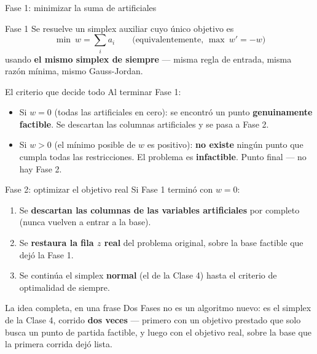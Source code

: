 \documentclass[aspectratio=169]{beamer}
\begin{document}
\begin{frame}{Fase 1: minimizar la suma de artificiales}
\begin{block}{Fase 1}
\small Se resuelve un simplex auxiliar cuyo único objetivo es
\[
\min\ w=\sum_i a_i \qquad\text{(equivalentemente, } \max\ w'=-w\text{)}
\]
usando \textbf{el mismo simplex de siempre} --- misma regla de entrada, misma razón mínima, mismo Gauss-Jordan.
\normalsize
\end{block}

\vspace{-0.1cm}
\begin{alertblock}{El criterio que decide todo}
\small Al terminar Fase 1:
\begin{itemize}
\item Si $w=0$ (todas las artificiales en cero): se encontró un punto \textbf{genuinamente factible}. Se descartan las columnas artificiales y se pasa a Fase 2.
\item Si $w>0$ (el mínimo posible de $w$ es positivo): \textbf{no existe} ningún punto que cumpla todas las restricciones. El problema es \textbf{infactible}. Punto final --- no hay Fase 2.
\end{itemize}
\normalsize
\end{alertblock}
\end{frame}

\begin{frame}{Fase 2: optimizar el objetivo real}
Si Fase 1 terminó con $w=0$:

\begin{enumerate}
\item Se \textbf{descartan las columnas de las variables artificiales} por completo (nunca vuelven a entrar a la base).
\item Se \textbf{restaura la fila $z$ real} del problema original, sobre la base factible que dejó la Fase 1.
\item Se continúa el simplex \textbf{normal} (el de la Clase 4) hasta el criterio de optimalidad de siempre.
\end{enumerate}

\begin{alertblock}{La idea completa, en una frase}
Dos Fases no es un algoritmo nuevo: es el simplex de la Clase 4, corrido \textbf{dos veces} --- primero con un objetivo prestado que solo busca un punto de partida factible, y luego con el objetivo real, sobre la base que la primera corrida dejó lista.
\end{alertblock}
\end{frame}
\end{document}
